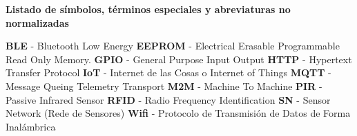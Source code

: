 \renewcommand{\thepage}{\Roman{page}}
    \textbf{\Large Listado de símbolos, términos especiales y abreviaturas no normalizadas}\newline

    \textbf{BLE} - Bluetooth Low Energy
    \newline
    \textbf{EEPROM} - Electrical Erasable Programmable Read Only Memory.
    \newline
    \textbf{GPIO} - General Purpose Input Output
    \newline
    \textbf{HTTP} - Hypertext Transfer Protocol
    \newline
    \textbf{IoT} - Internet de las Cosas o Internet of Things
    \newline
    \textbf{MQTT} - Message Queing Telemetry Transport
    \newline
    \textbf{M2M} - Machine To Machine
    \newline
    \textbf{PIR} - Passive Infrared Sensor
    \newline
    \textbf{RFID} - Radio Frequency Identification
    \newline
    \textbf{SN} - Sensor Network (Rede de Sensores)
    \newline
    \textbf{Wifi} - Protocolo de Transmisión de Datos de Forma Inalámbrica
    
    
    
    
    
    
    
    \setcounter{page}{1}
    \thispagestyle{plain}
